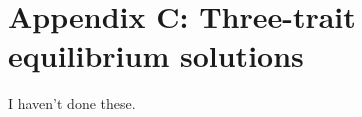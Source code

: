 \section*{Appendix C: Three-trait equilibrium solutions}

\renewcommand{\thefigure}{C\arabic{figure}}
\renewcommand{\theequation}{C\arabic{equation}}
\renewcommand{\thetable}{C\arabic{table}}
\setcounter{equation}{0}
\setcounter{figure}{0}
\setcounter{table}{0}


I haven't done these.
